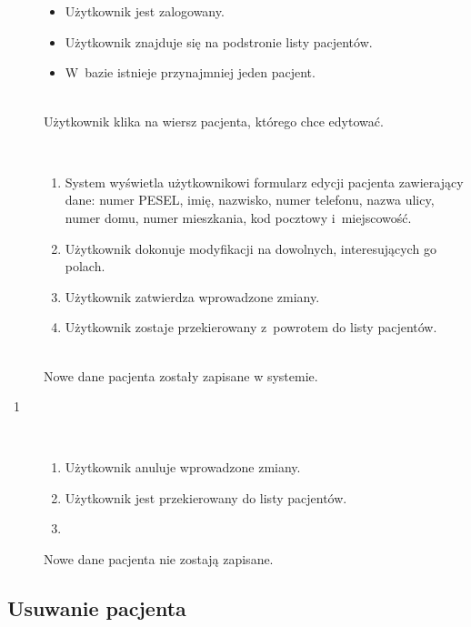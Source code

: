\documentclass[11pt]{aghdpl}
\begin{document}
	\begin{description}
		\item[\useCaseAktor] \hfill \\
			\useCaseUzytkownik
		\item[\useCaseWarPocz] \hfill \\
			\begin{itemize}
				\item Użytkownik jest zalogowany.
				\item Użytkownik znajduje się na podstronie listy pacjentów.
				\item W~bazie istnieje przynajmniej jeden pacjent.
			\end{itemize}
		\item[\useCaseZdarzInicj] \hfill \\
			Użytkownik klika na wiersz pacjenta, którego chce edytować.
		\item[\useCaseScenBaz] \hfill \\ 
			\begin{enumerate}
				\item System wyświetla użytkownikowi formularz edycji pacjenta zawierający dane: numer PESEL, imię, nazwisko, numer telefonu, nazwa ulicy, numer domu, numer mieszkania, kod pocztowy i~miejscowość.
				\item Użytkownik dokonuje modyfikacji na dowolnych, interesujących go polach.
				\item Użytkownik zatwierdza wprowadzone zmiany.
				\item Użytkownik zostaje przekierowany z~powrotem do listy pacjentów.
			\end{enumerate}
		\item[\useCaseWarKonc] \hfill \\ 
			Nowe dane pacjenta zostały zapisane w systemie.
		\item[\useCaseWyjatek~1] \hfill \\
			\begin{enumerate}[label=3a\arabic*.]
				\item Użytkownik anuluje wprowadzone zmiany.
				\item Użytkownik jest przekierowany do listy pacjentów.
				\item \useCaseEnd
			\end{enumerate}
			Nowe dane pacjenta nie zostają zapisane.
	\end{description}
	
\subsection{Usuwanie pacjenta}
\end{document}
